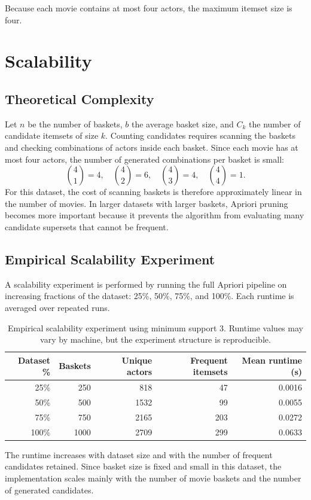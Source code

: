 \documentclass[11pt,a4paper]{article}
\begin{document}
Because each movie contains at most four actors, the maximum itemset size is four.

\section{Scalability}

\subsection{Theoretical Complexity}
Let $n$ be the number of baskets, $b$ the average basket size, and $C_k$ the number of candidate itemsets of size $k$. Counting candidates requires scanning the baskets and checking combinations of actors inside each basket. Since each movie has at most four actors, the number of generated combinations per basket is small:
\[
\binom{4}{1}=4, \quad \binom{4}{2}=6, \quad \binom{4}{3}=4, \quad \binom{4}{4}=1.
\]
For this dataset, the cost of scanning baskets is therefore approximately linear in the number of movies. In larger datasets with larger baskets, Apriori pruning becomes more important because it prevents the algorithm from evaluating many candidate supersets that cannot be frequent.

\subsection{Empirical Scalability Experiment}
A scalability experiment is performed by running the full Apriori pipeline on increasing fractions of the dataset: 25\%, 50\%, 75\%, and 100\%. Each runtime is averaged over repeated runs.

\begin{table}[H]
\centering
\begin{tabular}{rrrrr}
\toprule
Dataset \% & Baskets & Unique actors & Frequent itemsets & Mean runtime (s) \\
\midrule
25\% & 250 & 818 & 47 & 0.0016 \\
50\% & 500 & 1532 & 99 & 0.0055 \\
75\% & 750 & 2165 & 203 & 0.0272 \\
100\% & 1000 & 2709 & 299 & 0.0633 \\
\bottomrule
\end{tabular}
\caption{Empirical scalability experiment using minimum support 3. Runtime values may vary by machine, but the experiment structure is reproducible.}
\end{table}

The runtime increases with dataset size and with the number of frequent candidates retained. Since basket size is fixed and small in this dataset, the implementation scales mainly with the number of movie baskets and the number of generated candidates.
\end{document}
